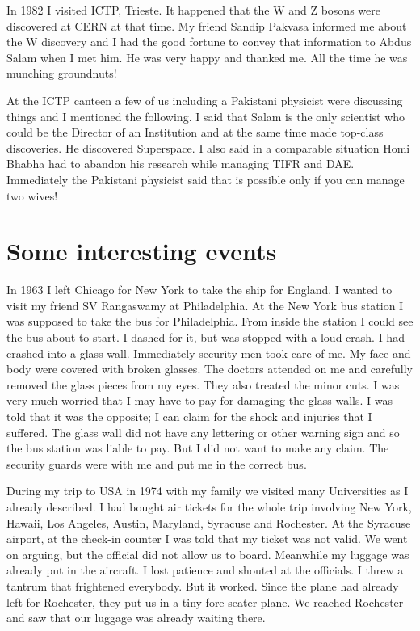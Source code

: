 In 1982 I visited ICTP, Trieste. It happened that the W and Z bosons 
were discovered at CERN at that time. My friend Sandip Pakvasa informed 
me about the W discovery and I had the good fortune to convey that 
information to Abdus Salam when I met him. He was very happy and thanked 
me. All the time he was munching groundnuts!

At the ICTP canteen a few of us including a Pakistani physicist were 
discussing things and I mentioned the following. I said that Salam is 
the only scientist who could be the Director of an Institution and at 
the same time made top-class discoveries. He discovered Superspace. I 
also said in a comparable situation Homi Bhabha had to abandon his 
research while managing TIFR and DAE. Immediately the Pakistani 
physicist said that is possible only if you can manage two wives!

\vspace{-\topsep}
\section*{Some interesting events}

In 1963 I left Chicago for New York to take the ship for England. I 
wanted to visit my friend SV Rangaswamy at Philadelphia. At the New York 
bus station I was supposed to take the bus for Philadelphia. From inside 
the station I could see the bus about to start. I dashed for it, but was 
stopped with a loud crash. I had crashed into a glass wall. Immediately 
security men took care of me. My face and body were covered with broken 
glasses. The doctors attended on me and carefully removed the glass 
pieces from my eyes. They also treated the minor cuts. I was very much 
worried that I may have to pay for damaging the glass walls. I was told 
that it was the opposite; I can claim for the shock and injuries that I 
suffered. The glass wall did not have any lettering or other warning 
sign and so the bus station was liable to pay. But I did not want to 
make any claim. The security guards were with me and put me in the 
correct bus.
\smallskip

During my trip to USA in 1974 with my family we visited many 
Universities as I already described. I had bought air tickets for the 
whole trip involving New York, Hawaii, Los Angeles, Austin, Maryland, 
Syracuse and Rochester. At the Syracuse airport, at the check-in counter 
I was told that my ticket was not valid. We went on arguing, but the 
official did not allow us to board. Meanwhile my luggage was already put 
in the aircraft. I lost patience and shouted at the officials. I threw a 
tantrum that frightened everybody. But it worked. Since the plane had 
already left for Rochester, they put us in a tiny fore-seater plane. We 
reached Rochester and saw that our luggage was already waiting there.
\smallskip

